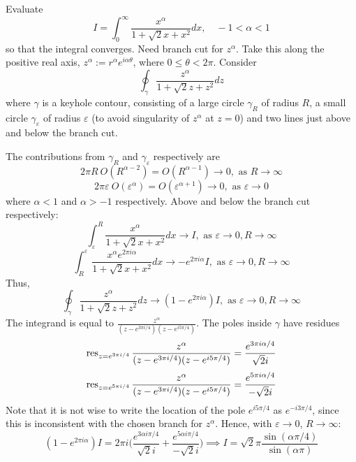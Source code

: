 \documentclass[a4paper]{article}
\begin{document}
\begin{eg}
Evaluate
$$I=\int_0^\infty\frac{x^\alpha}{1+\sqrt{2}x+x^2}dx,\quad -1<\alpha<1$$
so that the integral converges. Need branch cut for $z^\alpha$. Take this along the positive real axis, $z^\alpha:=r^\alpha e^{i\alpha\theta}$, where $0\leq\theta<2\pi$. Consider
$$\oint_\gamma\frac{z^\alpha}{1+\sqrt{2}z+z^2}dz$$
where $\gamma$ is a keyhole contour, consisting of a large circle $\gamma_R$ of radius $R$, a small circle $\gamma_\varepsilon$ of radius $\varepsilon$ (to avoid singularity of $z^\alpha$ at $z=0$) and two lines just above and below the branch cut.
   \begin{center}
  \end{center}
  The contributions from $\gamma_R$ and $\gamma_\varepsilon$ respectively are
  $$2\pi R~O(R^{\alpha-2})=O(R^{\alpha-1})\rightarrow 0,\text{   as }R\rightarrow\infty$$
  $$2\pi\varepsilon ~O(\varepsilon^{\alpha})=O(\varepsilon^{\alpha+1})\rightarrow 0,\text{   as }\varepsilon\rightarrow0$$
  where $\alpha<1$ and $\alpha>-1$ respectively. Above and below the branch cut respectively:
  $$\int_{\varepsilon}^R\frac{x^\alpha}{1+\sqrt{2}x+x^2}dx\rightarrow I,\text{  as  }\varepsilon\rightarrow0,R\rightarrow\infty$$
  $$\int_R^{\varepsilon}\frac{x^\alpha e^{2\pi i\alpha}}{1+\sqrt{2}x+x^2}dx\rightarrow-e^{2\pi i\alpha}I,\text{  as  }\varepsilon\rightarrow0,R\rightarrow\infty$$
  Thus,
  $$\oint_\gamma\frac{z^\alpha}{1+\sqrt{2}z+z^2}dz\rightarrow(1-e^{2\pi i\alpha})I,\text{  as }\varepsilon\rightarrow0,R\rightarrow\infty$$
  The integrand is equal to $\frac{z^\alpha}{(z-e^{3\pi i/4})(z-e^{i5\pi/4})}$. The poles inside $\gamma$ have residues
  $$\operatorname{res}_{z=e^{3\pi i/4}}\frac{z^\alpha}{(z-e^{3\pi i/4})(z-e^{i5\pi/4})}=\frac{e^{3\pi i\alpha/4}}{\sqrt{2}i}$$
  $$\operatorname{res}_{z=e^{5\pi i/4}}\frac{z^\alpha}{(z-e^{3\pi i/4})(z-e^{i5\pi/4})}=\frac{e^{5\pi i\alpha/4}}{-\sqrt{2}i}$$
  Note that it is not wise to write the location of the pole $e^{i5\pi/4}$ as $e^{-i3\pi/4}$, since this is inconsistent with the chosen branch for $z^\alpha$. Hence, with $\varepsilon\rightarrow0$, $R\rightarrow\infty$:
  $$(1-e^{2\pi i\alpha})I=2\pi i\bigg(\frac{e^{3\alpha i\pi/4}}{\sqrt{2}i}+\frac{e^{5\alpha i\pi/4}}{-\sqrt{2}i}\bigg)\implies I=\sqrt{2}\pi\frac{\sin(\alpha\pi/4)}{\sin(\alpha\pi)}$$
\end{eg}
\end{document}
